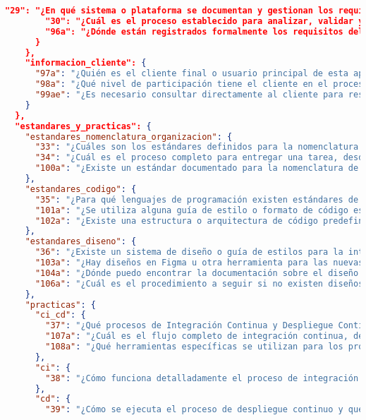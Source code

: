 \begin{lstlisting}[language=json, caption={Listado de elicitación de preguntas procesadas y clasificadas}, label={listado:preguntas}]
        "29": "¿En qué sistema o plataforma se documentan y gestionan los requisitos del proyecto?",
        "30": "¿Cuál es el proceso establecido para analizar, validar y aprobar nuevos requisitos?",
        "96a": "¿Dónde están registrados formalmente los requisitos del proyecto (Jira, Confluence, documentos, hojas de cálculo)?"
      }
    },
    "informacion_cliente": {
      "97a": "¿Quién es el cliente final o usuario principal de esta aplicación y cuál es su contexto de uso?",
      "98a": "¿Qué nivel de participación tiene el cliente en el proceso de desarrollo y toma de decisiones?",
      "99ae": "¿Es necesario consultar directamente al cliente para resolver dudas sobre determinadas funcionalidades o requisitos?"
    }
  },
  "estandares_y_practicas": {
    "estandares_nomenclatura_organizacion": {
      "33": "¿Cuáles son los estándares definidos para la nomenclatura y gestión de branches, commits y pull requests?",
      "34": "¿Cuál es el proceso completo para entregar una tarea, desde su finalización hasta la aprobación?",
      "100a": "¿Existe un estándar documentado para la nomenclatura de branches, commits y otros elementos del repositorio?"
    },
    "estandares_codigo": {
      "35": "¿Para qué lenguajes de programación existen estándares de codificación definidos en el proyecto?",
      "101a": "¿Se utiliza alguna guía de estilo o formato de código específico para cada lenguaje del proyecto?",
      "102a": "¿Existe una estructura o arquitectura de código predefinida que deba seguirse?"
    },
    "estandares_diseno": {
      "36": "¿Existe un sistema de diseño o guía de estilos para la interfaz de usuario?",
      "103a": "¿Hay diseños en Figma u otra herramienta para las nuevas pantallas o componentes a desarrollar?",
      "104a": "¿Dónde puedo encontrar la documentación sobre el diseño visual y la experiencia de usuario a implementar?",
      "106a": "¿Cuál es el procedimiento a seguir si no existen diseños definidos para un componente o pantalla?"
    },
    "practicas": {
      "ci_cd": {
        "37": "¿Qué procesos de Integración Continua y Despliegue Continuo (CI/CD) están implementados?",
        "107a": "¿Cuál es el flujo completo de integración continua, desde el commit hasta la validación?",
        "108a": "¿Qué herramientas específicas se utilizan para los procesos de integración y despliegue continuo?"
      },
      "ci": {
        "38": "¿Cómo funciona detalladamente el proceso de integración continua y qué validaciones incluye?"
      },
      "cd": {
        "39": "¿Cómo se ejecuta el proceso de despliegue continuo y qué entornos abarca?"

\end{lstlisting}
